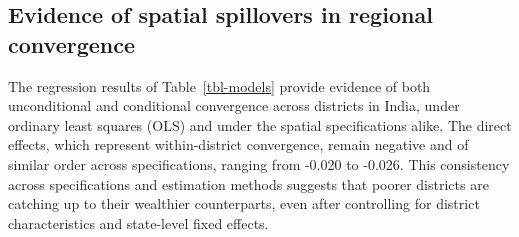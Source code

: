 \documentclass[
  letterpaper,
  DIV=11,
  numbers=noendperiod]{scrartcl}
\begin{document}
\subsection{Evidence of spatial spillovers in regional
convergence}\label{evidence-of-spatial-spillovers-in-regional-convergence}

The regression results of Table~\ref{tbl-models} provide evidence of
both unconditional and conditional convergence across districts in
India, under ordinary least squares (OLS) and under the spatial
specifications alike. The direct effects, which represent
within-district convergence, remain negative and of similar order across
specifications, ranging from -0.020 to -0.026. This consistency across
specifications and estimation methods suggests that poorer districts are
catching up to their wealthier counterparts, even after controlling for
district characteristics and state-level fixed effects.

\begingroup\footnotesize\setlength{\tabcolsep}{3pt}
\end{document}
